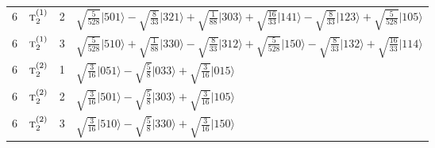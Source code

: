 \documentclass[11pt]{article}
\newcommand{\irr}[1]{\text{\normalfont\scshape #1}}
\newcommand{\occ}[1]{\lvert #1\rangle}
\begin{document}
\begin{longtable}{c l c p{}}
6 & $\irr{t}_{2}^{(1)}$ & 2 & $\sqrt{\tfrac{5}{528}}\occ{501}-\sqrt{\tfrac{8}{33}}\occ{321}+\sqrt{\tfrac{1}{88}}\occ{303}+\sqrt{\tfrac{16}{33}}\occ{141}-\sqrt{\tfrac{8}{33}}\occ{123}+\sqrt{\tfrac{5}{528}}\occ{105}$\\
6 & $\irr{t}_{2}^{(1)}$ & 3 & $\sqrt{\tfrac{5}{528}}\occ{510}+\sqrt{\tfrac{1}{88}}\occ{330}-\sqrt{\tfrac{8}{33}}\occ{312}+\sqrt{\tfrac{5}{528}}\occ{150}-\sqrt{\tfrac{8}{33}}\occ{132}+\sqrt{\tfrac{16}{33}}\occ{114}$\\
6 & $\irr{t}_{2}^{(2)}$ & 1 & $\sqrt{\tfrac{3}{16}}\occ{051}-\sqrt{\tfrac{5}{8}}\occ{033}+\sqrt{\tfrac{3}{16}}\occ{015}$\\
6 & $\irr{t}_{2}^{(2)}$ & 2 & $\sqrt{\tfrac{3}{16}}\occ{501}-\sqrt{\tfrac{5}{8}}\occ{303}+\sqrt{\tfrac{3}{16}}\occ{105}$\\
6 & $\irr{t}_{2}^{(2)}$ & 3 & $\sqrt{\tfrac{3}{16}}\occ{510}-\sqrt{\tfrac{5}{8}}\occ{330}+\sqrt{\tfrac{3}{16}}\occ{150}$\\
\hline
\end{longtable}
\end{document}
